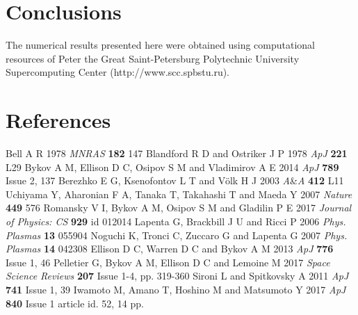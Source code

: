 \documentclass[a4paper]{jpconf}
\begin{document}
\section{Conclusions}

\ack

The numerical results presented here were obtained using computational resources of Peter the Great Saint-Petersburg Polytechnic University Supercomputing Center (http://www.scc.spbstu.ru). 

\section*{References}
\begin{thebibliography}{20}
	 Bell A R 1978 \textit{MNRAS} \textbf{182} 147
	 Blandford R D and Ostriker J P 1978 \textit{ApJ} \textbf{221} L29 
	 Bykov A M, Ellison D C, Osipov S M and Vladimirov A E 2014 \textit{ApJ} \textbf{789} Issue 2, 137
	 Berezhko E G, Ksenofontov L T and V{\"o}lk H J  2003 \textit{A}{\&}\textit{A} \textbf{412} L11
	 Uchiyama Y, Aharonian F A, Tanaka T, Takahashi T and Maeda Y 2007 \textit{Nature} \textbf{449} 576
	 Romansky V I, Bykov A M, Osipov S M and Gladilin P E 2017 \textit{Journal of Physics: CS} \textbf{929} id 012014 
	 Lapenta G, Brackbill J U and Ricci P 2006 \textit{Phys. Plasmas} \textbf{13} 055904
	 Noguchi K, Tronci C, Zuccaro G and Lapenta G 2007 \textit{Phys. Plasmas} \textbf{14} 042308
	 Ellison D C, Warren D C and Bykov A M 2013 \textit{ApJ} \textbf{776} Issue 1, 46
	 Pelletier G, Bykov A M, Ellison D C and Lemoine M 2017 \textit{Space Science Reviews} \textbf{207} Issue 1-4, pp. 319-360
	 Sironi L and Spitkovsky A 2011 \textit{ApJ} \textbf{741} Issue 1, 39
	 Iwamoto M, Amano T, Hoshino M and Matsumoto Y 2017 \textit{ApJ} \textbf{840} Issue 1 article id. 52, 14 pp.
\end{thebibliography}
\end{document}

